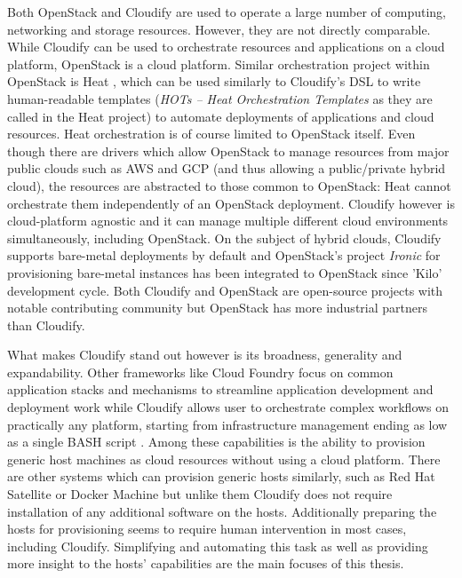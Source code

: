 Both OpenStack and Cloudify are used to operate a large number of computing, networking and storage resources. However, they are not directly comparable. While Cloudify can be used to orchestrate resources and applications on a cloud platform, OpenStack is a cloud platform. Similar orchestration project within OpenStack is Heat \cite{heat}, which can be used similarly to Cloudify's DSL to write human-readable templates (\textit{HOTs -- Heat Orchestration Templates} as they are called in the Heat project) to automate deployments of applications and cloud resources. Heat orchestration is of course limited to OpenStack itself. Even though there are drivers which allow OpenStack to manage resources from major public clouds such as AWS and GCP (and thus allowing a public/private hybrid cloud), the resources are abstracted to those common to OpenStack: Heat cannot orchestrate them independently of an OpenStack deployment. Cloudify however is cloud-platform agnostic and it can manage multiple different cloud environments simultaneously, including OpenStack. On the subject of hybrid clouds, Cloudify supports bare-metal deployments by default and OpenStack's project \textit{Ironic} for provisioning bare-metal instances has  been integrated to OpenStack since 'Kilo' development cycle.
Both Cloudify and OpenStack are open-source projects with notable contributing community but OpenStack has more industrial partners than Cloudify. 

What makes Cloudify stand out however is its broadness, generality and expandability. Other frameworks like Cloud Foundry focus on common application stacks and mechanisms to streamline application development and deployment work while Cloudify allows user to orchestrate complex workflows on practically any platform, starting from infrastructure management ending as low as a single BASH script \cite{cloudifyfaq}. Among these capabilities is the ability to provision generic host machines as cloud resources without using a cloud platform. There are other systems which can provision generic hosts similarly, such as Red Hat Satellite \cite{redhatsatellite} or Docker Machine \cite{dockermachine} but unlike them Cloudify does not require installation of any additional software on the hosts. Additionally preparing the hosts for provisioning seems to require human intervention in most cases, including Cloudify. Simplifying and automating this task as well as providing more insight to the hosts' capabilities  are the main focuses of this thesis.

\pagebreak
